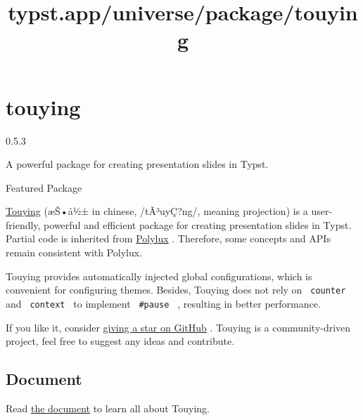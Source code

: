 \title{typst.app/universe/package/touying}

\label{banner}
\section{touying}\label{touying}

{ 0.5.3 }

A powerful package for creating presentation slides in Typst.

{ } Featured Package

\label{readme}
\href{https://github.com/touying-typ/touying}{Touying} (æŠ•å½± in
chinese, /tÃ³uyÇ?ng/, meaning projection) is a user-friendly, powerful
and efficient package for creating presentation slides in Typst. Partial
code is inherited from
\href{https://github.com/andreasKroepelin/polylux}{Polylux} . Therefore,
some concepts and APIs remain consistent with Polylux.

Touying provides automatically injected global configurations, which is
convenient for configuring themes. Besides, Touying does not rely on
\texttt{\ counter\ } and \texttt{\ context\ } to implement
\texttt{\ \#pause\ } , resulting in better performance.

If you like it, consider
\href{https://github.com/touying-typ/touying}{giving a star on GitHub} .
Touying is a community-driven project, feel free to suggest any ideas
and contribute.

\href{https://touying-typ.github.io/}{}
\href{https://github.com/touying-typ/touying/wiki}{}

\subsection{Document}\label{document}

Read \href{https://touying-typ.github.io/}{the document} to learn all
about Touying.

